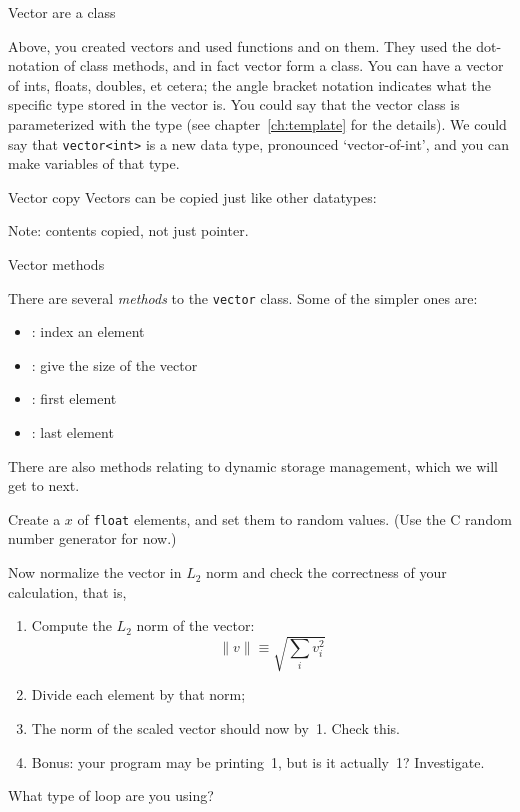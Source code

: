  {Vector are a class}
\label{sec:stdvector}

Above, you created vectors and used functions  and 
on them. They used the dot-notation of class methods, and in fact
vector form a  class. You can have a vector of ints,
floats, doubles, et cetera; 
the angle bracket notation indicates what the specific type stored in
the vector is.
You could say that the vector class is parameterized with the type (see
chapter~\ref{ch:template} for the details). We could say that
\lstinline{vector<int>} is a new data type, pronounced `vector-of-int', and you can
make variables of that type.

\begin{block}{Vector copy}
  \label{sl:vectorcopy}
  Vectors can be copied just like other datatypes:
\begin{cpp4c}
    Note: contents copied, not just pointer.
\end{cpp4c}
\end{block}

 {Vector methods}

There are several \emph{methods}
to the \lstinline{vector} class. Some of the simpler ones are:
\begin{itemize}
\item {}: index an element
\item {}: give the size of the vector
\item {}: first element
\item {}: last element
\end{itemize}

There are also methods relating to dynamic storage management, which
we will get to next.

\begin{exercise}
  \label{ex:vectornormalize}
  Create a  $x$ of \lstinline{float} elements, and set them to random
  values. (Use the C random number generator for now.)

  Now normalize the vector in $L_2$ norm and check the correctness of
  your calculation, that is,
  \begin{enumerate}
  \item Compute the $L_2$ norm of the vector:
    \[ \| v\| \equiv \sqrt{\sum_iv_i^2} \]
  \item Divide each element by that norm;
  \item The norm of the scaled vector should now by~1. Check this.
  \item Bonus: your program may be printing~1, but is it actually~1?
    Investigate.
  \end{enumerate}
  What type of loop are you using?
\end{exercise}


